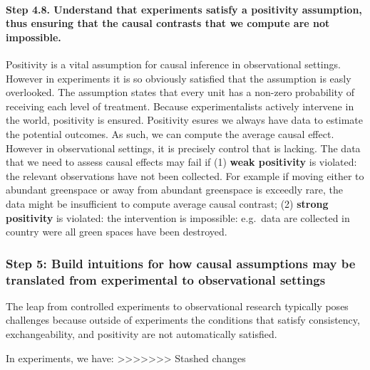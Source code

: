 \documentclass[
  singlecolumn]{article}
\let\oldparagraph\paragraph
\renewcommand{\paragraph}[1]{\oldparagraph{#1}\mbox{}}
\begin{document}
\begin{table}
{\paragraph{\texorpdfstring{\textbf{Step 4.8. Understand that experiments
satisfy a positivity assumption, thus ensuring that the causal contrasts
that we compute are not
impossible.}}{Step 4.8. Understand that experiments satisfy a positivity assumption, thus ensuring that the causal contrasts that we compute are not impossible.}}\label{step-4.8.-understand-that-experiments-satisfy-a-positivity-assumption-thus-ensuring-that-the-causal-contrasts-that-we-compute-are-not-impossible.}

Positivity is a vital assumption for causal inference in observational
settings. However in experiments it is so obviously satisfied that the
assumption is easly overlooked. The assumption states that every unit
has a non-zero probability of receiving each level of treatment. Because
experimentalists actively intervene in the world, positivity is ensured.
Positivity esures we always have data to estimate the potential
outcomes. As such, we can compute the average causal effect. However in
observational settings, it is precisely control that is lacking. The
data that we need to assess causal effects may fail if (1) \textbf{weak
positivity} is violated: the relevant observations have not been
collected. For example if moving either to abundant greenspace or away
from abundant greenspace is exceedly rare, the data might be
insufficient to compute average causal contrast; (2) \textbf{strong
positivity} is violated: the intervention is impossible: e.g.~data are
collected in country were all green spaces have been destroyed.

\subsubsection{Step 5: Build intuitions for how causal assumptions may
be translated from experimental to observational
settings}\label{step-5-build-intuitions-for-how-causal-assumptions-may-be-translated-from-experimental-to-observational-settings}

The leap from controlled experiments to observational research typically
poses challenges because outside of experiments the conditions that
satisfy consistency, exchangeability, and positivity are not
automatically satisfied.

In experiments, we have:
>>>>>>> Stashed changes

}

\end{table}%
\end{document}
